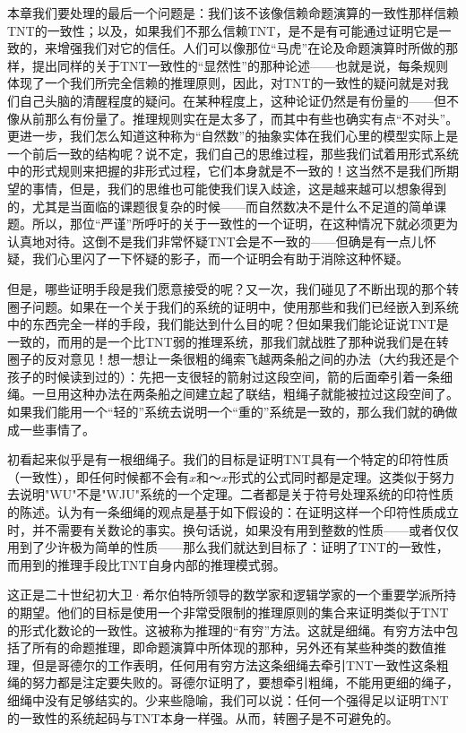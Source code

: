 本章我们要处理的最后一个问题是：我们该不该像信赖命题演算的一致性那样信赖TNT的一致性；以及，如果我们不那么信赖TNT，是不是有可能通过证明它是一致的，来增强我们对它的信任。人们可以像那位“马虎”在论及命题演算时所做的那样，提出同样的关于TNT一致性的“显然性”的那种论述——也就是说，每条规则体现了一个我们所完全信赖的推理原则，因此，对TNT的一致性的疑问就是对我们自己头脑的清醒程度的疑问。在某种程度上，这种论证仍然是有份量的——但不像从前那么有份量了。推理规则实在是太多了，而其中有些也确实有点“不对头”。更进一步，我们怎么知道这种称为“自然数”的抽象实体在我们心里的模型实际上是一个前后一致的结构呢？说不定，我们自己的思维过程，那些我们试着用形式系统中的形式规则来把握的非形式过程，它们本身就是不一致的！这当然不是我们所期望的事情，但是，我们的思维也可能使我们误入歧途，这是越来越可以想象得到的，尤其是当面临的课题很复杂的时候——而自然数决不是什么不足道的简单课题。所以，那位“严谨”所呼吁的关于一致性的一个证明，在这种情况下就必须更为认真地对待。这倒不是我们非常怀疑TNT会是不一致的——但确是有一点儿怀疑，我们心里闪了一下怀疑的影子，而一个证明会有助于消除这种怀疑。

但是，哪些证明手段是我们愿意接受的呢？又一次，我们碰见了不断出现的那个转圈子问题。如果在一个关于我们的系统的证明中，使用那些和我们已经嵌入到系统中的东西完全一样的手段，我们能达到什么目的呢？但如果我们能论证说TNT是一致的，而用的是一个比TNT弱的推理系统，那我们就战胜了那种说我们是在转圈子的反对意见！想一想让一条很粗的绳索飞越两条船之间的办法（大约我还是个孩子的时候读到过的）：先把一支很轻的箭射过这段空间，箭的后面牵引着一条细绳。一旦用这种办法在两条船之间建立起了联结，粗绳子就能被拉过这段空间了。如果我们能用一个“轻的”系统去说明一个“重的”系统是一致的，那么我们就的确做成一些事情了。

初看起来似乎是有一根细绳子。我们的目标是证明TNT具有一个特定的印符性质（一致性），即任何时候都不会有$x$和$～x$形式的公式同时都是定理。这类似于努力去说明"WU"不是"WJU"系统的一个定理。二者都是关于符号处理系统的印符性质的陈述。认为有一条细绳的观点是基于如下假设的：在证明这样一个印符性质成立时，并不需要有关数论的事实。换句话说，如果没有用到整数的性质——或者仅仅用到了少许极为简单的性质——那么我们就达到目标了：证明了TNT的一致性，而用到的推理手段比TNT自身内部的推理模式弱。

这正是二十世纪初大卫·希尔伯特所领导的数学家和逻辑学家的一个重要学派所持的期望。他们的目标是使用一个非常受限制的推理原则的集合来证明类似于TNT的形式化数论的一致性。这被称为推理的“有穷”方法。这就是细绳。有穷方法中包括了所有的命题推理，即命题演算中所体现的那种，另外还有某些种类的数值推理，但是哥德尔的工作表明，任何用有穷方法这条细绳去牵引TNT一致性这条粗绳的努力都是注定要失败的。哥德尔证明了，要想牵引粗绳，不能用更细的绳子，细绳中没有足够结实的。少来些隐喻，我们可以说：任何一个强得足以证明TNT的一致性的系统起码与TNT本身一样强。从而，转圈子是不可避免的。
